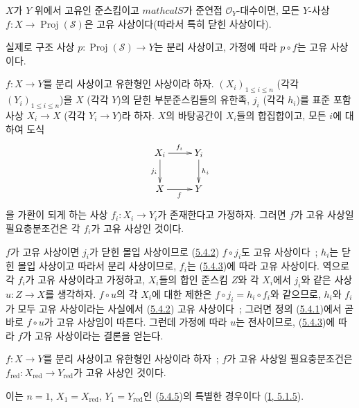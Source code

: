 \begin{corollary}[5.4.4]
\label{II.5.4.4-ko}
$X$가 $Y$ 위에서 고유인 준스킴이고 $mathcal{S}$가 준연접
$\mathcal{O}_Y$-대수이면, 모든 $Y$-사상
$f:X\to\operatorname{Proj}(\mathcal{S})$은 고유 사상이다(따라서 특히
닫힌 사상이다).
\end{corollary}

실제로 구조 사상 $p:\operatorname{Proj}(\mathcal{S})\to Y$는 분리
사상이고, 가정에 따라 $p\circ f$는 고유 사상이다.

\begin{corollary}[5.4.5]
\label{II.5.4.5-ko}
$f:X\to Y$를 분리 사상이고 유한형인 사상이라 하자.
$(X_i)_{1\leq i\leq n}$ (각각 $(Y_i)_{1\leq i\leq n}$)을 $X$ (각각
$Y$)의 닫힌 부분준스킴들의 유한족, $j_i$ (각각 $h_i$)를 표준 포함 사상
$X_i\to X$ (각각 $Y_i\to Y$)라 하자. $X$의 바탕공간이 $X_i$들의
합집합이고, 모든 $i$에 대하여 도식
\[
  \xymatrix{
    X_i\ar[r]^{f_i}\ar[d]_{j_i} & Y_i\ar[d]^{h_i}\\
    X\ar[r]_f & Y
  }
\]
을 가환이 되게 하는 사상 $f_i:X_i\to Y_i$가 존재한다고 가정하자.
그러면 $f$가 고유 사상일 필요충분조건은 각 $f_i$가 고유 사상인 것이다.
\end{corollary}


$f$가 고유 사상이면 $j_i$가 닫힌 몰입 사상이므로
(\hyperref[II.5.4.2-ko]{5.4.2}) $f\circ j_i$도 고유 사상이다~; $h_i$는
닫힌 몰입 사상이고 따라서 분리 사상이므로, $f_i$는
(\hyperref[II.5.4.3-ko]{5.4.3})에 따라 고유 사상이다. 역으로 각
$f_i$가 고유 사상이라고 가정하고, $X_i$들의 합인 준스킴 $Z$와 각
$X_i$에서 $j_i$와 같은 사상 $u:Z\to X$를 생각하자. $f\circ u$의 각
$X_i$에 대한 제한은 $f\circ j_i=h_i\circ f_i$와 같으므로, $h_i$와
$f_i$가 모두 고유 사상이라는 사실에서
(\hyperref[II.5.4.2-ko]{5.4.2}) 고유 사상이다~; 그러면 정의
(\hyperref[II.5.4.1-ko]{5.4.1})에서 곧바로 $f\circ u$가 고유 사상임이
따른다. 그런데 가정에 따라 $u$는 전사이므로,
(\hyperref[II.5.4.3-ko]{5.4.3})에 따라 $f$가 고유 사상이라는 결론을
얻는다.

\begin{corollary}[5.4.6]
\label{II.5.4.6-ko}
$f:X\to Y$를 분리 사상이고 유한형인 사상이라 하자~; $f$가 고유
사상일 필요충분조건은
$f_{\mathrm{red}}:X_{\mathrm{red}}\to Y_{\mathrm{red}}$가 고유 사상인
것이다.
\end{corollary}

이는 $n=1$, $X_1=X_{\mathrm{red}}$, $Y_1=Y_{\mathrm{red}}$인
(\hyperref[II.5.4.5-ko]{5.4.5})의 특별한 경우이다
(\hyperref[I.5.1.5-ko]{I, 5.1.5}).

